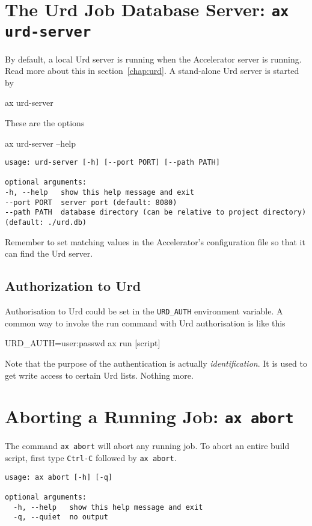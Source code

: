 \begin{shell}
\section{The Urd Job Database Server: \texttt{ax urd-server}}
By default, a local Urd server is running when the Accelerator server
is running.  Read more about this in section~\ref{chap:urd}.  A
stand-alone Urd server is started by
\begin{shell}
ax urd-server
\end{shell}
These are the options
\begin{shell}
ax urd-server --help
\end{shell}
\begin{snugshade}
\begin{verbatim}
usage: urd-server [-h] [--port PORT] [--path PATH]

optional arguments:
-h, --help   show this help message and exit
--port PORT  server port (default: 8080)
--path PATH  database directory (can be relative to project directory)
(default: ./urd.db)
\end{verbatim}
\end{snugshade}
Remember to set matching values in the Accelerator's configuration
file so that it can find the Urd server.


\subsection{Authorization to Urd}
Authorisation to Urd could be set in the \texttt{URD\_AUTH}
environment variable.  A common way to invoke the run command with Urd
authorisation is like this
\begin{shell}
URD_AUTH=user:passwd ax run [script]
\end{shell}
Note that the purpose of the authentication is
actually \textsl{identification}.  It is used to get write access to
certain Urd lists.  Nothing more.


\section{Aborting a Running Job: \texttt{ax abort}}
The command \texttt{ax abort} will abort any running job.  To abort an
entire build script, first type \texttt{Ctrl-C} followed by \texttt{ax
  abort}.
\begin{snugshade}
\begin{verbatim}
usage: ax abort [-h] [-q]

optional arguments:
  -h, --help   show this help message and exit
  -q, --quiet  no output
\end{verbatim}
\end{snugshade}



\end{shell}
